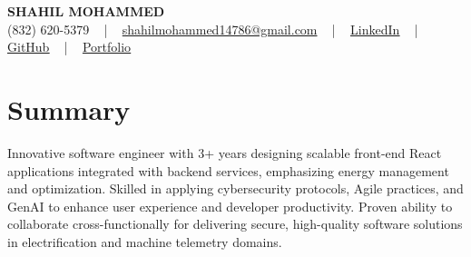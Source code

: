 \documentclass[letterpaper,10pt]{article}
\begin{document}
\begin{center}
    {\fontsize{14pt}{12pt}\selectfont \textbf{\MakeUppercase{Shahil Mohammed}}}\\ \vspace{2pt}
    \fontsize{10pt}{12pt}\selectfont (832) 620-5379 ~ | ~ \href{mailto:shahilmohammed14786@gmail.com}{shahilmohammed14786@gmail.com} ~ | ~  
    \href{https://www.linkedin.com/in/shahil-mohammed-9652931a1/}{\color{blue}\underline{LinkedIn}}  ~ | ~ 
    \href{https://github.com/freakbeast14}{\color{blue}\underline{GitHub}} ~ | ~ 
    \href{https://shahil-mohammed.netlify.app/}{\color{blue}\underline{Portfolio}}
    \vspace{-8pt}
\end{center}

\section{Summary}
\vspace{-2pt}\fontsize{8pt}{9pt}\selectfont
Innovative software engineer with 3+ years designing scalable front-end React applications integrated with backend services, emphasizing energy management and optimization. Skilled in applying cybersecurity protocols, Agile practices, and GenAI to enhance user experience and developer productivity. Proven ability to collaborate cross-functionally for delivering secure, high-quality software solutions in electrification and machine telemetry domains.
 \vspace{-5pt}
 
\vspace{-2pt}
\end{document}
